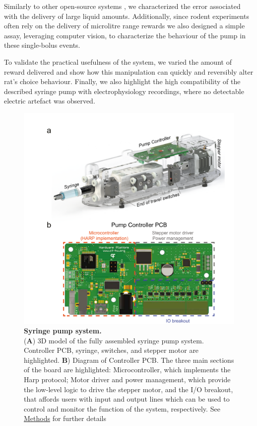 Similarly to other open-source systems \citep{Wijnen2014, Amarante2019}, we characterized the error associated with the delivery of large liquid amounts. Additionally, since rodent experiments often rely on the delivery of microlitre range rewards we also designed a simple assay, leveraging computer vision, to characterize the behaviour of the pump in these single-bolus events.

To validate the practical usefulness of the system, we varied the amount of reward delivered and show how this manipulation can quickly and reversibly alter rat's choice behaviour. Finally, we also highlight the high compatibility of the described syringe pump with electrophysiology recordings, where no detectable electric artefact was observed.


\begin{figure}
	\centering
	\includegraphics[width=1.0\linewidth]{Figures/Artboard 1.pdf}
	\caption{\textbf{Syringe pump system.}\\
		(\textbf{A}) 3D model of the fully assembled syringe pump system. Controller PCB, syringe, switches, and stepper motor are highlighted.  \textbf{B}) Diagram of Controller PCB. The three main sections of the board are highlighted: Microcontroller, which implements the Harp protocol; Motor driver and power management, which provide the low-level logic to drive the stepper motor, and the I/O breakout, that affords users with input and output lines which can be used to control and monitor the function of the system, respectively. See \hyperref[s:methods]{Methods} for further details}
	\label{fig:PumpDrawing}
\end{figure}
